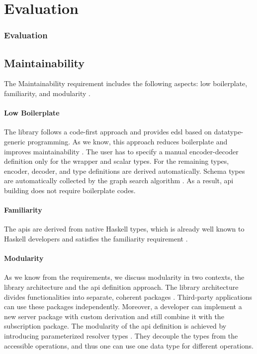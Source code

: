 \section{Evaluation}
\begin{frame}
    \frametitle{Evaluation}

    

\subsection{Maintainability}

The Maintainability requirement includes the following aspects: low boilerplate, familiarity, and modularity .  

\paragraph{Low Boilerplate} The library follows a code-first approach and provides \gls{edsl} based on data\-type-generic programming. As we know, this approach reduces boilerplate and improves maintainability . %
The user has to specify a manual encoder-decoder definition only for the wrapper and scalar types. For the remaining types, encoder, decoder, and type definitions are derived automatically.
Schema types are automatically collected by 
the graph search algorithm . 
As a result, \gls{api} building does not require boilerplate codes.

\paragraph{Familiarity} The \gls{apis} are derived from native Haskell types, which is already well known to Haskell developers and satisfies the familiarity requirement .  

\paragraph{Modularity}
As we know from the requirements, we discuss modularity in two contexts, the library architecture and the \gls{api} definition approach.
The library architecture divides functionalities into separate, coherent packages . Third-party applications can use these packages independently. Moreover, a developer can implement a new server package with custom derivation and still combine it with the subscription package. The modularity of the \gls{api} definition is achieved by introducing parameterized resolver types . They decouple the types from the accessible operations, and thus one can use one data type for different operations.



\end{frame}
